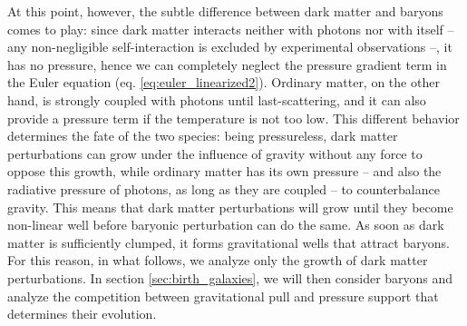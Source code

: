  At this point, however, the subtle difference between dark matter and baryons comes to play: since dark matter interacts neither with photons nor with itself -- any non-negligible self-interaction is excluded by experimental observations \citep{tulin2018dark} --, it has no pressure, hence we can completely neglect the pressure gradient term in the Euler equation (eq. \ref{eq:euler_linearized2}). Ordinary matter, on the other hand, is strongly coupled with photons until last-scattering, and it can also provide a pressure term if the temperature is not too low. This different behavior determines the fate of the two species: being pressureless, dark matter perturbations can grow under the influence of gravity without any force to oppose this growth, while ordinary matter has its own pressure -- and also the radiative pressure of photons, as long as they are coupled -- to counterbalance gravity. This means that dark matter perturbations will grow until they become non-linear well before baryonic perturbation can do the same. As soon as dark matter is sufficiently clumped, it forms gravitational wells that attract baryons. For this reason, in what follows, we analyze only the growth of dark matter perturbations. In section \ref{sec:birth_galaxies}, we will then consider baryons and analyze the competition between gravitational pull and pressure support that determines their evolution. 
 

